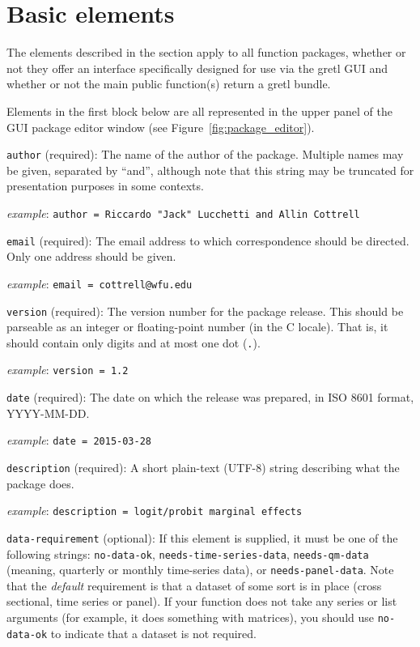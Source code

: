 \documentclass[oneside]{book}
\newcommand{\ttusage}[1]{\textit{example}: \quad \texttt{#1}}
\newcommand{\vbusage}[0]{\textit{example}: \quad}
\begin{document}
\section{Basic elements}
\label{sec:spec-basic}

The elements described in the section apply to all function packages,
whether or not they offer an interface specifically designed for
use via the gretl GUI and whether or not the main public function(s)
return a gretl bundle.

Elements in the first block below are all represented in the upper
panel of the GUI package editor window (see
Figure~\ref{fig:package_editor}).

\begin{description}

\item \texttt{author} (required): The name of the author of the
  package. Multiple names may be given, separated by ``and'', although
  note that this string may be truncated for presentation purposes in
  some contexts.

  \vbusage{} \verb|author = Riccardo "Jack" Lucchetti and Allin Cottrell|

\item \texttt{email} (required): The email address to which
  correspondence should be directed. Only one address should be given.

  \vbusage{} \verb|email = cottrell@wfu.edu|

\item \texttt{version} (required): The version number for the package
  release. This should be parseable as an integer or floating-point
  number (in the \textsf{C} locale). That is, it should contain only
  digits and at most one dot (\texttt{.}).

  \ttusage{version = 1.2}

\item \texttt{date} (required): The date on which the release was
  prepared, in ISO 8601 format, \textsf{YYYY-MM-DD}.

  \ttusage{date = 2015-03-28}

\item \texttt{description} (required): A short plain-text (UTF-8)
  string describing what the package does.

  \ttusage{description = logit/probit marginal effects}

\item \texttt{data-requirement} (optional): If this element is
  supplied, it must be one of the following strings:
  \texttt{no-data-ok}, \texttt{needs-time-series-data},
  \texttt{needs-qm-data} (meaning, quarterly or monthly time-series
  data), or \texttt{needs-panel-data}. Note that the \textit{default}
  requirement is that a dataset of some sort is in place (cross
  sectional, time series or panel). If your function does not take any
  series or list arguments (for example, it does something with
  matrices), you should use \texttt{no-data-ok} to indicate that a
  dataset is not required.


\end{description}
\end{document}
